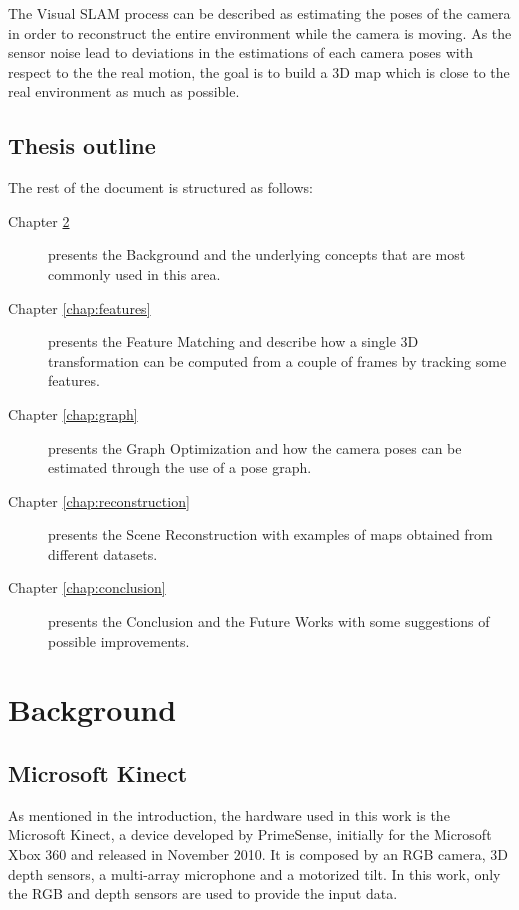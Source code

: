 The Visual SLAM process can be described as estimating the poses of the camera in order to reconstruct the entire environment while the camera is moving. As the sensor noise lead to deviations in the estimations of each camera poses with respect to the the real motion, the goal is to build a 3D map which is close to the real environment as much as possible.

\section{Thesis outline}

The rest of the document is structured as follows:
\begin{description}
\item[Chapter \ref{chap:background}] presents the Background and the underlying concepts that are most commonly used in this area.
\item[Chapter \ref{chap:features}] presents the Feature Matching and describe how a single 3D transformation can be computed  from a couple of frames by tracking some features.
\item[Chapter \ref{chap:graph}] presents the Graph Optimization and how the camera poses can be estimated through the use of a pose graph.
\item[Chapter \ref{chap:reconstruction}] presents the Scene Reconstruction with examples of maps obtained from different datasets.
\item[Chapter \ref{chap:conclusion}] presents the Conclusion and the Future Works with some suggestions of possible improvements.
\end{description}

\chapter{Background}
\label{chap:background}

\section{Microsoft Kinect}

As mentioned in the introduction, the hardware used in this work is the Microsoft Kinect, a device developed by PrimeSense, initially for the Microsoft Xbox 360 and released in November 2010. It is composed by an RGB camera, 3D depth sensors, a multi-array microphone and a motorized tilt. In this work, only the RGB and depth sensors are used to provide the input data.

